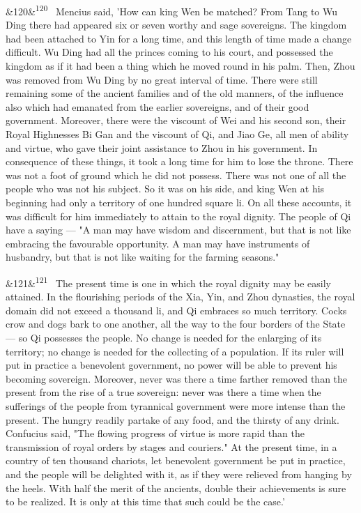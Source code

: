 \documentclass[12pt]{article}
\newcommand{\para}[1][]{\par\noindent\ifx&#1&\else\textsuperscript{\footnotesize #1}~\fi}
\begin{document}
\para[120] Mencius said, 'How can king Wen be matched? From Tang to Wu Ding there had appeared six or seven worthy and sage sovereigns. The kingdom had been attached to Yin for a long time, and this length of time made a change difficult. Wu Ding had all the princes coming to his court, and possessed the kingdom as if it had been a thing which he moved round in his palm. Then, Zhou was removed from Wu Ding by no great interval of time. There were still remaining some of the ancient families and of the old manners, of the influence also which had emanated from the earlier sovereigns, and of their good government. Moreover, there were the viscount of Wei and his second son, their Royal Highnesses Bi Gan and the viscount of Qi, and Jiao Ge, all men of ability and virtue, who gave their joint assistance to Zhou in his government. In consequence of these things, it took a long time for him to lose the throne. There was not a foot of ground which he did not possess. There was not one of all the people who was not his subject. So it was on his side, and king Wen at his beginning had only a territory of one hundred square li. On all these accounts, it was difficult for him immediately to attain to the royal dignity. The people of Qi have a saying --- "A man may have wisdom and discernment, but that is not like embracing the favourable opportunity. A man may have instruments of husbandry, but that is not like waiting for the farming seasons."

\para[121] The present time is one in which the royal dignity may be easily attained. In the flourishing periods of the Xia, Yin, and Zhou dynasties, the royal domain did not exceed a thousand li, and Qi embraces so much territory. Cocks crow and dogs bark to one another, all the way to the four borders of the State --- so Qi possesses the people. No change is needed for the enlarging of its territory; no change is needed for the collecting of a population. If its ruler will put in practice a benevolent government, no power will be able to prevent his becoming sovereign. Moreover, never was there a time farther removed than the present from the rise of a true sovereign: never was there a time when the sufferings of the people from tyrannical government were more intense than the present. The hungry readily partake of any food, and the thirsty of any drink. Confucius said, "The flowing progress of virtue is more rapid than the transmission of royal orders by stages and couriers." At the present time, in a country of ten thousand chariots, let benevolent government be put in practice, and the people will be delighted with it, as if they were relieved from hanging by the heels. With half the merit of the ancients, double their achievements is sure to be realized. It is only at this time that such could be the case.'
\end{document}
